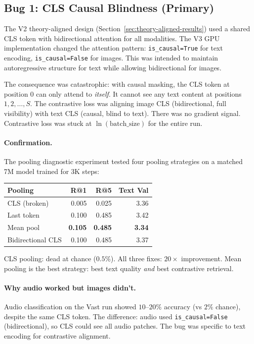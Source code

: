 \documentclass[11pt, a4paper]{article}
\theoremstyle{plain}
\theoremstyle{remark}
\begin{document}
\subsection{Bug 1: CLS Causal Blindness (Primary)}

The V2 theory-aligned design (Section~\ref{sec:theory-aligned-results}) used a shared CLS token with bidirectional attention for all modalities.
The V3 GPU implementation changed the attention pattern: \texttt{is\_causal=True} for text encoding, \texttt{is\_causal=False} for images.
This was intended to maintain autoregressive structure for text while allowing bidirectional for images.

The consequence was catastrophic: with causal masking, the CLS token at position 0 can only attend to \emph{itself}.
It cannot see any text content at positions $1, 2, \ldots, S$.
The contrastive loss was aligning image CLS (bidirectional, full visibility) with text CLS (causal, blind to text).
There was no gradient signal. Contrastive loss was stuck at $\ln(\text{batch\_size})$ for the entire run.

\paragraph{Confirmation.}
The pooling diagnostic experiment tested four pooling strategies on a matched 7M model trained for 3K steps:

\begin{center}\small
\begin{tabular}{lrrr}
\toprule
\textbf{Pooling} & \textbf{R@1} & \textbf{R@5} & \textbf{Text Val} \\
\midrule
CLS (broken) & 0.005 & 0.025 & 3.36 \\
Last token   & 0.100 & 0.485 & 3.42 \\
Mean pool    & \textbf{0.105} & \textbf{0.485} & \textbf{3.34} \\
Bidirectional CLS & 0.100 & 0.485 & 3.37 \\
\bottomrule
\end{tabular}
\end{center}

CLS pooling: dead at chance ($0.5\%$). All three fixes: $20\times$ improvement.
Mean pooling is the best strategy: best text quality \emph{and} best contrastive retrieval.

\paragraph{Why audio worked but images didn't.}
Audio classification on the Vast run showed $10$--$20\%$ accuracy (vs $2\%$ chance), despite the same CLS token.
The difference: audio used \texttt{is\_causal=False} (bidirectional), so CLS could see all audio patches.
The bug was specific to text encoding for contrastive alignment.
\end{document}
